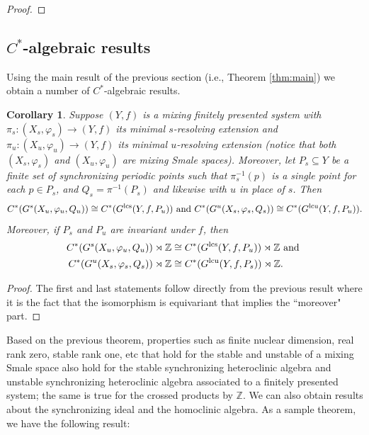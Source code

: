 \documentclass{amsart}
\newcommand{\Z}{{\mathbb Z}}
\newcommand{\lcu}{\text{lcu}}
\newcommand{\lcs}{\text{lcs}}
\theoremstyle{plain}
\newtheorem{corollary}[theorem]{Corollary}
\theoremstyle{definition}
\theoremstyle{remark}
\begin{document}
\begin{proof}
\end{proof}



\subsection{$C^\ast$-algebraic results}
Using the main result of the previous section (i.e., Theorem \ref{thm:main}) we obtain a number of $C^*$-algebraic results. 
\begin{corollary}
Suppose $(Y, f)$ is a mixing finitely presented system with $\pi_s : (X_s, \varphi_s) \rightarrow (Y, f)$ its minimal $s$-resolving extension and $\pi_u : (X_u, \varphi_u) \rightarrow (Y, f)$ its minimal $u$-resolving extension (notice that both $(X_s, \varphi_s)$ and $(X_u, \varphi_u)$ are mixing Smale spaces). Moreover, let $P_s \subseteq Y$ be a finite set of synchronizing periodic points such that $\pi_s^{-1}(p)$ is a single point for each $p\in P_s$, and $Q_s=\pi^{-1}(P_s)$ and likewise with $u$ in place of $s$. Then 
\[
C^*(G^s(X_u, \varphi_u, Q_u)) \cong C^*(G^\lcs(Y, f, P_u)) \hbox{ and } C^*(G^u(X_s, \varphi_s, Q_s)) \cong C^*(G^\lcu(Y, f, P_u)).
\]
Moreover, if $P_s$ and $P_u$ are invariant under $f$, then
\begin{align*}
C^*(G^s(X_u, \varphi_u, Q_u)) \rtimes \Z & \cong C^*(G^\lcs(Y, f, P_u))\rtimes \Z  \hbox{ and } \\
C^*(G^u(X_s, \varphi_s, Q_s))\rtimes \Z & \cong C^*(G^\lcu(Y, f, P_s))\rtimes \Z.
\end{align*}
\end{corollary}
\begin{proof}
The first and last statements follow directly from the previous result where it is the fact that the isomorphism is equivariant that implies the ``moreover" part.
\end{proof}

Based on the previous theorem, properties such as finite nuclear dimension, real rank zero, stable rank one, etc that hold for the stable and unstable of a mixing Smale space also hold for the stable synchronizing heteroclinic algebra and unstable synchronizing heteroclinic algebra associated to a finitely presented system; the same is true for the crossed products by $\Z$. We can also obtain results about the synchronizing ideal and the homoclinic algebra. As a sample theorem, we have the following result:
\end{document}
